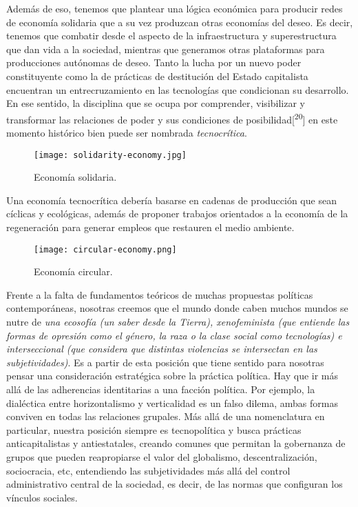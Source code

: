 Además de eso, tenemos que plantear una lógica económica para producir redes de economía solidaria que a su vez produzcan otras economías del deseo. Es decir, tenemos que combatir desde el aspecto de la infraestructura y superestructura que dan vida a la sociedad, mientras que generamos otras plataformas para producciones autónomas de deseo. Tanto la lucha por un nuevo poder constituyente como la de prácticas de destitución del Estado capitalista encuentran un entrecruzamiento en las tecnologías que condicionan su desarrollo. En ese sentido, la disciplina que se ocupa por comprender, visibilizar y transformar las relaciones de poder y sus condiciones de posibilidad[\textsuperscript{20}] en este momento histórico bien puede ser nombrada \emph{tecnocrítica}.

\begin{figure}[htbp]
	\centering
	\texttt{[image: solidarity-economy.jpg]}
	\caption{Economía solidaria.}
	\label{fig:solidarieco}
\end{figure}

Una economía tecnocrítica debería basarse en cadenas de producción que sean cíclicas y ecológicas, además de proponer trabajos orientados a la economía de la regeneración para generar empleos que restauren el medio ambiente.

\begin{figure}[htbp]
	\centering
	\texttt{[image: circular-economy.png]}
	\caption{Economía circular.}
	\label{fig:circuleco}
\end{figure}

Frente a la falta de fundamentos teóricos de muchas propuestas políticas contemporáneas, nosotras creemos que el mundo donde caben muchos mundos se nutre de \emph{una ecosofía (un saber desde la Tierra), xenofeminista (que entiende las formas de opresión como el género, la raza o la clase social como tecnologías) e interseccional (que considera que distintas violencias se intersectan en las subjetividades)}. Es a partir de esta posición que tiene sentido para nosotras pensar una consideración estratégica sobre la práctica política. Hay que ir más allá de las adherencias identitarias a una facción política. Por ejemplo, la dialéctica entre horizontalismo y verticalidad es un falso dilema, ambas formas conviven en todas las relaciones grupales. Más allá de una nomenclatura en particular, nuestra posición siempre es tecnopolítica y busca prácticas anticapitalistas y antiestatales, creando comunes que permitan la gobernanza de grupos que pueden reapropiarse el valor del globalismo, descentralización, sociocracia, etc, entendiendo las subjetividades más allá del control administrativo central de la sociedad, es decir, de las normas que configuran los vínculos sociales.

